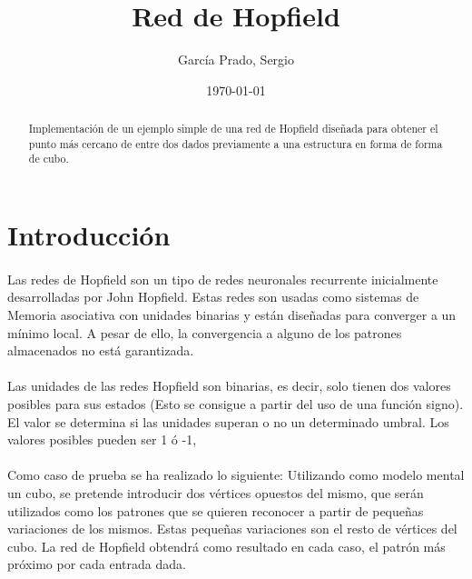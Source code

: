 \documentclass[10pt, a4paper,spanish]{article}
\title{\vspace{-15mm}\fontsize{24pt}{10pt}\selectfont\textbf{Red de Hopfield}}
\author{García Prado, Sergio}
\date{\today}
\begin{document}
	\maketitle

	\thispagestyle{fancy}



	\begin{abstract}
		\noindent Implementación de un ejemplo simple de una red de Hopfield diseñada para obtener el punto más cercano de entre dos dados previamente a una estructura en forma de forma de cubo.
	\end{abstract}



  \section{Introducción}

    \paragraph{}
		Las redes de Hopfield son un tipo de redes neuronales recurrente inicialmente desarrolladas por John Hopfield. Estas redes son usadas como sistemas de Memoria asociativa con unidades binarias y están diseñadas para converger a un mínimo local. A pesar de ello, la convergencia a alguno de los patrones almacenados no está garantizada.

		\paragraph{}
		Las unidades de las redes Hopfield son binarias, es decir, solo tienen dos valores posibles para sus estados (Esto se consigue a partir del uso de una función signo). El valor se determina si las unidades superan o no un determinado umbral. Los valores posibles pueden ser 1 ó -1,

		\paragraph{}
		Como caso de prueba se ha realizado lo siguiente: Utilizando como modelo mental un cubo, se pretende introducir dos vértices opuestos del mismo, que serán utilizados como los patrones que se quieren reconocer a partir de pequeñas variaciones de los mismos. Estas pequeñas variaciones son el resto de vértices del cubo. La red de Hopfield obtendrá como resultado en cada caso, el patrón más próximo por cada entrada dada.
\end{document}
